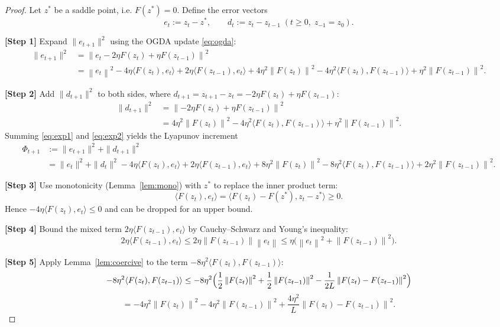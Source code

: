 \documentclass{article}
\newcommand{\norm}[1]{\left\|#1\right\|}
\newcommand{\inner}[2]{\langle #1,#2\rangle}
\begin{document}
\begin{proof}
Let $z^{*}$ be a saddle point, i.e. $F(z^{*})=0$.  Define the error vectors
\[
e_{t}:=z_{t}-z^{*},\qquad d_{t}:=z_{t}-z_{t-1}\;(t\ge0,\;z_{-1}=z_{0}).
\]

\noindent\textbf{[Step 1]}  Expand $\|e_{t+1}\|^{2}$ using the OGDA update \eqref{eq:ogda}:
\begin{align}
\|e_{t+1}\|^{2}
&=\norm{e_{t}-2\eta F(z_{t})+\eta F(z_{t-1})}^{2}\nonumber\\
&=\norm{e_{t}}^{2}
-4\eta\inner{F(z_{t})}{e_{t}}
+2\eta\inner{F(z_{t-1})}{e_{t}}
+4\eta^{2}\norm{F(z_{t})}^{2}
-4\eta^{2}\inner{F(z_{t})}{F(z_{t-1})}
+\eta^{2}\norm{F(z_{t-1})}^{2}.
\label{eq:exp1}
\end{align}

\noindent\textbf{[Step 2]}  Add $\|d_{t+1}\|^{2}$ to both sides, where $d_{t+1}=z_{t+1}-z_{t}= -2\eta F(z_{t})+\eta F(z_{t-1})$:
\begin{align}
\|d_{t+1}\|^{2}
&= \norm{-2\eta F(z_{t})+\eta F(z_{t-1})}^{2}\nonumber\\
&=4\eta^{2}\norm{F(z_{t})}^{2}
-4\eta^{2}\inner{F(z_{t})}{F(z_{t-1})}
+\eta^{2}\norm{F(z_{t-1})}^{2}.
\label{eq:exp2}
\end{align}
Summing \eqref{eq:exp1} and \eqref{eq:exp2} yields the Lyapunov increment
\begin{align}
\Phi_{t+1}
&:=\|e_{t+1}\|^{2}+\|d_{t+1}\|^{2}\nonumber\\
&=\|e_{t}\|^{2}+\|d_{t}\|^{2}
-4\eta\inner{F(z_{t})}{e_{t}}
+2\eta\inner{F(z_{t-1})}{e_{t}}
+8\eta^{2}\norm{F(z_{t})}^{2}
-8\eta^{2}\inner{F(z_{t})}{F(z_{t-1})}
+2\eta^{2}\norm{F(z_{t-1})}^{2}.
\label{eq:phi_inc}
\end{align}

\noindent\textbf{[Step 3]}  Use monotonicity (Lemma~\ref{lem:mono}) with $z^{*}$ to replace the inner product term:
\[
\inner{F(z_{t})}{e_{t}}=\inner{F(z_{t})-F(z^{*})}{z_{t}-z^{*}}\ge0.
\]
Hence $-4\eta\inner{F(z_{t})}{e_{t}}\le0$ and can be dropped for an upper bound.

\noindent\textbf{[Step 4]}  Bound the mixed term $2\eta\inner{F(z_{t-1})}{e_{t}}$ by Cauchy–Schwarz and Young’s inequality:
\[
2\eta\inner{F(z_{t-1})}{e_{t}}
\le 2\eta\norm{F(z_{t-1})}\norm{e_{t}}
\le \eta\bigl(\norm{e_{t}}^{2}+\norm{F(z_{t-1})}^{2}\bigr).
\tag{3}
\]

\noindent\textbf{[Step 5]}  Apply Lemma~\ref{lem:coercive} to the term $-8\eta^{2}\inner{F(z_{t})}{F(z_{t-1})}$:
\[
-8\eta^{2}\inner{F(z_{t})}{F(z_{t-1})}
\le -8\eta^{2}\Bigl(\frac{1}{2}\norm{F(z_{t})}^{2}+\frac{1}{2}\norm{F(z_{t-1})}^{2}
-\frac{1}{2L}\norm{F(z_{t})-F(z_{t-1})}^{2}\Bigr)
\]
\[
= -4\eta^{2}\norm{F(z_{t})}^{2}
-4\eta^{2}\norm{F(z_{t-1})}^{2}
+\frac{4\eta^{2}}{L}\norm{F(z_{t})-F(z_{t-1})}^{2}.
\tag{4}
\]


\end{proof}
\end{document}
